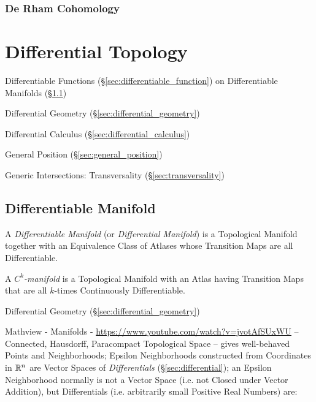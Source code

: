 \subsubsection{De Rham Cohomology}\label{sec:derham_cohomology}



\section{Differential Topology}\label{sec:differential_topology}

Differentiable Functions (\S\ref{sec:differentiable_function}) on Differentiable
Manifolds (\S\ref{sec:differentiable_manifold})

\fist Differential Geometry (\S\ref{sec:differential_geometry})

\fist Differential Calculus (\S\ref{sec:differential_calculus})

General Position (\S\ref{sec:general_position})

Generic Intersections: Transversality (\S\ref{sec:transversality})



\subsection{Differentiable Manifold}\label{sec:differentiable_manifold}

A \emph{Differentiable Manifold} (or \emph{Differential Manifold}) is a
Topological Manifold together with an Equivalence Class of Atlases whose
Transition Maps are all Differentiable.

A \emph{$C^k$-manifold} is a Topological Manifold with an Atlas having
Transition Maps that are all $k$-times Continuously Differentiable.

\fist Differential Geometry (\S\ref{sec:differential_geometry})

\asterism

Mathview - Manifolds - \url{https://www.youtube.com/watch?v=jvotAfSUxWU}
--
Connected, Hausdorff, Paracompact Topological Space -- gives well-behaved Points
and Neighborhoods;
Epsilon Neighborhoods constructed from Coordinates in
$\mathbb{R}^n$ are Vector Spaces of \emph{Differentials} (\S\ref{sec:differential});
an Epsilon Neighborhood normally is not a Vector Space (i.e. not Closed under
Vector Addition), but Differentials (i.e. arbitrarily small Positive Real
Numbers) are:

